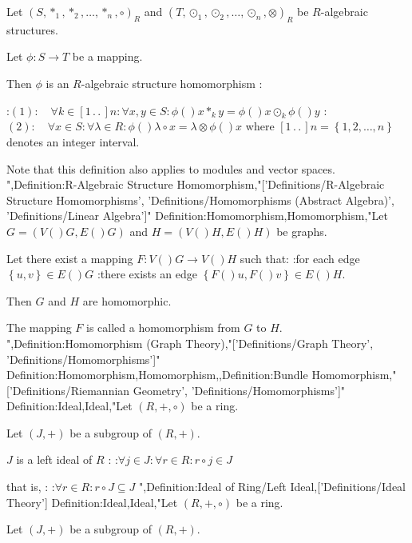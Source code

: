 Let $\left( S, \ast_1, \ast_2, \ldots, \ast_n, \circ \right)_R$ and $\left( T, \odot_1, \odot_2, \ldots, \odot_n, \otimes \right)_R$ be $R$-algebraic structures.

Let $\phi: S \to T$ be a mapping.


Then $\phi$ is an $R$-algebraic structure homomorphism :

:$(1): \quad \forall k \in \left[ 1 \,.\,.\,   \right]n: \forall x, y \in S: \phi \left(   \right){x \ast_k y} = \phi \left(   \right)x \odot_k \phi \left(   \right)y$
:$(2): \quad \forall x \in S: \forall \lambda \in R: \phi \left(   \right){\lambda \circ x} = \lambda \otimes \phi \left(   \right)x$
where $\left[ 1 \,.\,.\,   \right]n = \left\lbrace 1, 2, \ldots, n \right\rbrace$ denotes an integer interval.


Note that this definition also applies to modules and vector spaces.
",Definition:R-Algebraic Structure Homomorphism,"['Definitions/R-Algebraic Structure Homomorphisms', 'Definitions/Homomorphisms (Abstract Algebra)', 'Definitions/Linear Algebra']"
Definition:Homomorphism,Homomorphism,"Let $G = \left( V \left(   \right)G, E \left(   \right)G \right)$ and $H = \left( V \left(   \right)H, E \left(   \right)H \right)$ be graphs.


Let there exist a mapping $F: V \left(   \right)G \to V \left(   \right)H$ such that:
:for each edge $\left\lbrace u, v \right\rbrace \in E \left(   \right)G$
:there exists an edge $\left\lbrace F \left(   \right)u, F \left(   \right)v \right\rbrace \in E \left(   \right)H$.


Then $G$ and $H$ are homomorphic.

The mapping $F$ is called a homomorphism from $G$ to $H$.
",Definition:Homomorphism (Graph Theory),"['Definitions/Graph Theory', 'Definitions/Homomorphisms']"
Definition:Homomorphism,Homomorphism,,Definition:Bundle Homomorphism,"['Definitions/Riemannian Geometry', 'Definitions/Homomorphisms']"
Definition:Ideal,Ideal,"Let $\left( R, +, \circ \right)$ be a ring.

Let $\left( J, + \right)$ be a subgroup of $\left( R, + \right)$.


$J$ is a left ideal of $R$ :
:$\forall j \in J: \forall r \in R: r \circ j \in J$

that is, :
:$\forall r \in R: r \circ J \subseteq J$
",Definition:Ideal of Ring/Left Ideal,['Definitions/Ideal Theory']
Definition:Ideal,Ideal,"Let $\left( R, +, \circ \right)$ be a ring.

Let $\left( J, + \right)$ be a subgroup of $\left( R, + \right)$.


